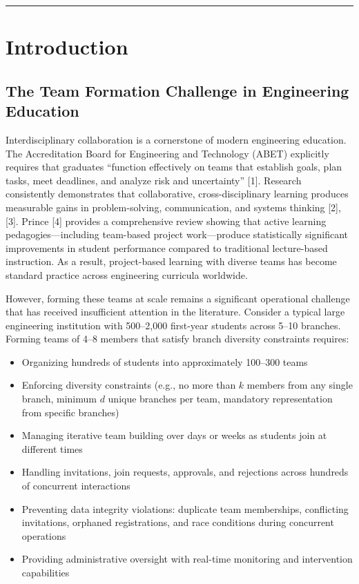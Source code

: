 \documentclass[12pt,a4paper]{article}
\begin{document}
\vspace{4pt}
\noindent\rule{\textwidth}{0.4pt}

\section{Introduction}

\subsection{The Team Formation Challenge in Engineering Education}

Interdisciplinary collaboration is a cornerstone of modern engineering education. The Accreditation Board for Engineering and Technology (ABET) explicitly requires that graduates ``function effectively on teams that establish goals, plan tasks, meet deadlines, and analyze risk and uncertainty'' [1]. Research consistently demonstrates that collaborative, cross-disciplinary learning produces measurable gains in problem-solving, communication, and systems thinking [2], [3]. Prince [4] provides a comprehensive review showing that active learning pedagogies---including team-based project work---produce statistically significant improvements in student performance compared to traditional lecture-based instruction. As a result, project-based learning with diverse teams has become standard practice across engineering curricula worldwide.

However, forming these teams at scale remains a significant operational challenge that has received insufficient attention in the literature. Consider a typical large engineering institution with 500--2,000 first-year students across 5--10 branches. Forming teams of 4--8 members that satisfy branch diversity constraints requires:

\begin{itemize}[noitemsep,topsep=3pt]
    \item Organizing hundreds of students into approximately 100--300 teams
    \item Enforcing diversity constraints (e.g., no more than $k$ members from any single branch, minimum $d$ unique branches per team, mandatory representation from specific branches)
    \item Managing iterative team building over days or weeks as students join at different times
    \item Handling invitations, join requests, approvals, and rejections across hundreds of concurrent interactions
    \item Preventing data integrity violations: duplicate team memberships, conflicting invitations, orphaned registrations, and race conditions during concurrent operations
    \item Providing administrative oversight with real-time monitoring and intervention capabilities
\end{itemize}
\end{document}
